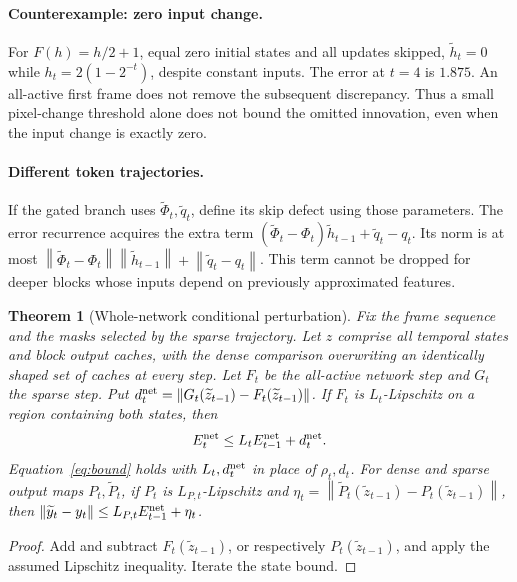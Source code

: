 \documentclass[11pt]{article}
\newtheorem{theorem}[proposition]{Theorem}
\newcommand{\norm}[1]{\left\lVert#1\right\rVert}
\begin{document}
\paragraph{Counterexample: zero input change.}
For $F(h)=h/2+1$, equal zero initial states and all updates skipped,
$\widetilde h_t=0$ while $h_t=2(1-2^{-t})$, despite constant inputs.
The error at $t=4$ is $1.875$. An all-active first frame does not remove
the subsequent discrepancy. Thus a small pixel-change threshold alone does
not bound the omitted innovation, even when the input change is exactly zero.

\paragraph{Different token trajectories.}
If the gated branch uses $\widetilde\Phi_t,\widetilde q_t$, define its skip
defect using those parameters. The error recurrence acquires the extra term
$(\widetilde\Phi_t-\Phi_t)\widetilde h_{t-1}+\widetilde q_t-q_t$.
Its norm is at most
$\norm{\widetilde\Phi_t-\Phi_t}\norm{\widetilde h_{t-1}}
+\norm{\widetilde q_t-q_t}$. This term cannot be dropped for deeper blocks
whose inputs depend on previously approximated features.

\begin{theorem}[Whole-network conditional perturbation]\label{thm:network}
Fix the frame sequence and the masks selected by the sparse trajectory.
Let $z$ comprise all temporal states and block output caches, with the dense
comparison overwriting an identically shaped set of caches at every step.
Let $F_t$ be the all-active network step and $G_t$ the sparse step. Put
$d_t^{\rm net}=\norm{G_t(\widetilde z_{t-1})-F_t(\widetilde z_{t-1})}$.
If $F_t$ is $L_t$-Lipschitz on a region containing both states, then
\begin{equation}
 E_t^{\rm net}\le L_tE_{t-1}^{\rm net}+d_t^{\rm net}.
\end{equation}
Equation~\eqref{eq:bound} holds with $L_t,d_t^{\rm net}$ in place of
$\rho_t,d_t$. For dense and sparse output maps $P_t,\widetilde P_t$, if
$P_t$ is $L_{P,t}$-Lipschitz and
$\eta_t=\norm{\widetilde P_t(\widetilde z_{t-1})-P_t(\widetilde z_{t-1})}$,
then $\norm{\widetilde y_t-y_t}\le L_{P,t}E_{t-1}^{\rm net}+\eta_t$.
\end{theorem}
\begin{proof}
Add and subtract $F_t(\widetilde z_{t-1})$, or respectively
$P_t(\widetilde z_{t-1})$, and apply the assumed Lipschitz inequality.
Iterate the state bound.
\end{proof}
\end{document}
